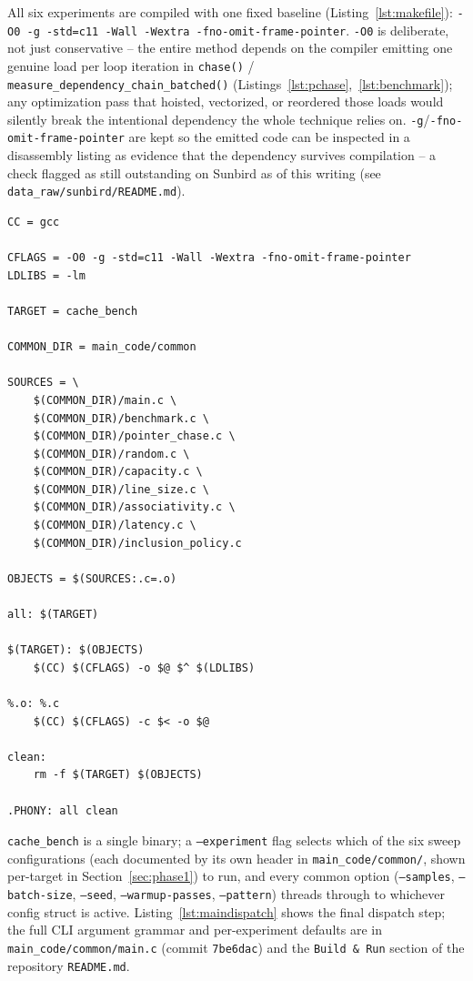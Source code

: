 \documentclass{article}
\begin{document}
All six experiments are compiled with one fixed baseline (Listing~\ref{lst:makefile}):
\texttt{-O0 -g -std=c11 -Wall -Wextra -fno-omit-frame-pointer}. \texttt{-O0} is deliberate,
not just conservative -- the entire method depends on the compiler emitting one genuine
load per loop iteration in \texttt{chase()} / \texttt{measure\_dependency\_chain\_batched()}
(Listings~\ref{lst:pchase},~\ref{lst:benchmark}); any optimization pass that hoisted,
vectorized, or reordered those loads would silently break the intentional dependency the
whole technique relies on. \texttt{-g}/\texttt{-fno-omit-frame-pointer} are kept so the
emitted code can be inspected in a disassembly listing as evidence that the dependency
survives compilation -- a check flagged as still outstanding on Sunbird as of this
writing (see \texttt{data\_raw/sunbird/README.md}).

\begin{lstlisting}[style=makestyle,caption={Build configuration (\texttt{Makefile}, commit \texttt{7be6dac}).},label={lst:makefile}]
CC = gcc

CFLAGS = -O0 -g -std=c11 -Wall -Wextra -fno-omit-frame-pointer
LDLIBS = -lm

TARGET = cache_bench

COMMON_DIR = main_code/common

SOURCES = \
	$(COMMON_DIR)/main.c \
	$(COMMON_DIR)/benchmark.c \
	$(COMMON_DIR)/pointer_chase.c \
	$(COMMON_DIR)/random.c \
	$(COMMON_DIR)/capacity.c \
	$(COMMON_DIR)/line_size.c \
	$(COMMON_DIR)/associativity.c \
	$(COMMON_DIR)/latency.c \
	$(COMMON_DIR)/inclusion_policy.c

OBJECTS = $(SOURCES:.c=.o)

all: $(TARGET)

$(TARGET): $(OBJECTS)
	$(CC) $(CFLAGS) -o $@ $^ $(LDLIBS)

%.o: %.c
	$(CC) $(CFLAGS) -c $< -o $@

clean:
	rm -f $(TARGET) $(OBJECTS)

.PHONY: all clean
\end{lstlisting}

\texttt{cache\_bench} is a single binary; a \texttt{--experiment} flag selects which of the
six sweep configurations (each documented by its own header in
\texttt{main\_code/common/}, shown per-target in Section~\ref{sec:phase1}) to run, and every
common option (\texttt{--samples}, \texttt{--batch-size}, \texttt{--seed},
\texttt{--warmup-passes}, \texttt{--pattern}) threads through to whichever config struct is
active. Listing~\ref{lst:maindispatch} shows the final dispatch step; the full CLI argument
grammar and per-experiment defaults are in \texttt{main\_code/common/main.c} (commit
\texttt{7be6dac}) and the \texttt{Build \& Run} section of the repository \texttt{README.md}.
\end{document}
